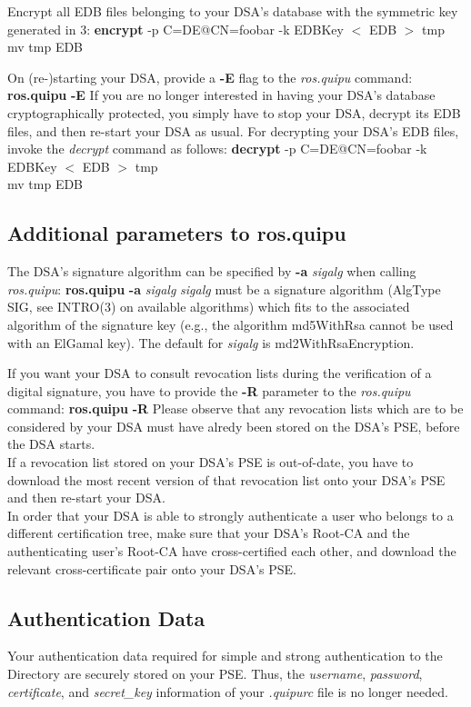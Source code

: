 \m Encrypt all EDB files belonging to your DSA's database with the symmetric key
generated in 3:
\bvtab
\1 {\bf encrypt} -p C=DE@CN=foobar -k EDBKey $<$ EDB $>$ tmp \\
\1 mv tmp EDB
\evtab

\m On (re-)starting your DSA, provide a {\bf -E} flag to the {\em ros.quipu} command:
\bvtab
\1 {\bf ros.quipu} {\bf -E}
\evtab
\ee
If you are no longer interested in having your DSA's database cryptographically protected,
you simply have to stop your DSA, decrypt its EDB files, and then re-start your DSA as usual.
For decrypting your DSA's EDB files, invoke the {\em decrypt} command as follows:
\bvtab
\1 {\bf decrypt} -p C=DE@CN=foobar -k EDBKey $<$ EDB $>$ tmp \\
\1 mv tmp EDB
\evtab


\subsection{Additional parameters to ros.quipu}
The DSA's signature algorithm can be specified by {\bf -a} {\em sigalg} when calling {\em ros.quipu}: 
\bvtab
\1 {\bf ros.quipu} {\bf -a} {\em sigalg}
\evtab
{\em sigalg} must be a signature algorithm (AlgType SIG, see INTRO(3) on available algorithms) 
which fits to the associated algorithm of the signature key (e.g., the algorithm md5WithRsa cannot 
be used with an ElGamal key). The default for {\em sigalg} is md2WithRsaEncryption.

If you want your DSA to consult revocation lists during the verification of a digital 
signature, you have to provide the {\bf -R} parameter to the {\em ros.quipu} command:
\bvtab
\1 {\bf ros.quipu} {\bf -R}
\evtab
Please observe that any revocation lists which are to be considered
by your DSA must have alredy been stored on the DSA's PSE, before the
DSA starts.
\\ [1em]
If a revocation list stored on your DSA's PSE is out-of-date, you have
to download the most recent version of that revocation list onto your 
DSA's PSE and then re-start your DSA.
\\ [1em]
In order that your DSA is able to strongly authenticate a user who
belongs to a different certification tree, make sure that your DSA's
Root-CA and the authenticating user's Root-CA have cross-certified each other, 
and download the relevant cross-certificate pair onto your DSA's PSE.


\subsection{Authentication Data}
Your authentication data required for simple and strong authentication to the
Directory are securely stored on your PSE. Thus, the {\em username}, {\em password}, {\em certificate}, 
and {\em secret\_key} information of your {\em .quipurc} file is no longer needed.


